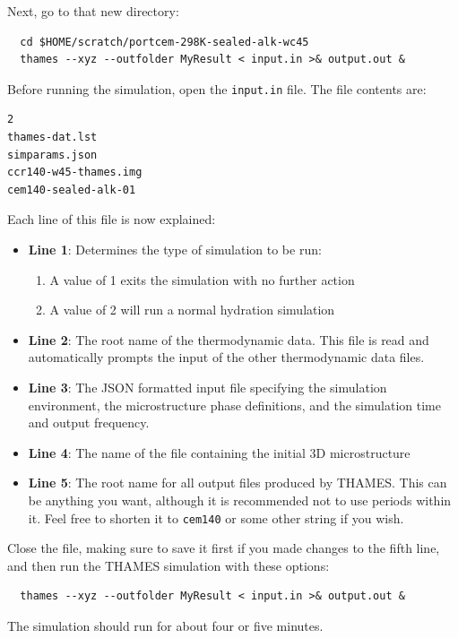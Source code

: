 \documentclass{article}
\begin{document}
\normalsize{ }
Next, go to that new directory:
\scriptsize{
	\begin{lstlisting}
  cd $HOME/scratch/portcem-298K-sealed-alk-wc45
  thames --xyz --outfolder MyResult < input.in >& output.out &
\end{lstlisting}
}

\normalsize{ }
Before running the simulation, open the \verb!input.in! file. The file contents
are:
\scriptsize{
	\begin{lstlisting}
2
thames-dat.lst
simparams.json
ccr140-w45-thames.img
cem140-sealed-alk-01
\end{lstlisting}
}

\normalsize{ }
Each line of this file is now explained:
\begin{itemize}
	\item \textbf{Line 1}: Determines the type of simulation to be run:
	      \begin{enumerate}
		      \item A value of 1 exits the simulation with no further action
		      \item A value of 2 will run a normal hydration simulation
	      \end{enumerate}
	\item \textbf{Line 2}: The root name of the thermodynamic data. This file is
	      read and automatically prompts the input of the other thermodynamic data
	      files.
	\item \textbf{Line 3}: The JSON formatted input file specifying the simulation
	      environment, the microstructure phase definitions, and the simulation time
	      and output frequency.
	\item \textbf{Line 4}: The name of the file containing the initial 3D microstructure
	\item \textbf{Line 5}: The root name for all output files produced by THAMES.
	      This can be anything you want, although it is recommended not to use periods
	      within it. Feel free to shorten it to \verb!cem140! or some other string if
	      you wish.
\end{itemize}
Close the file, making sure to save it first if you made changes to the fifth
line, and then run the THAMES simulation with these options:
\scriptsize{
	\begin{lstlisting}
  thames --xyz --outfolder MyResult < input.in >& output.out &
\end{lstlisting}
}

\normalsize{ }
The simulation should run for about four or five minutes.
\end{document}
